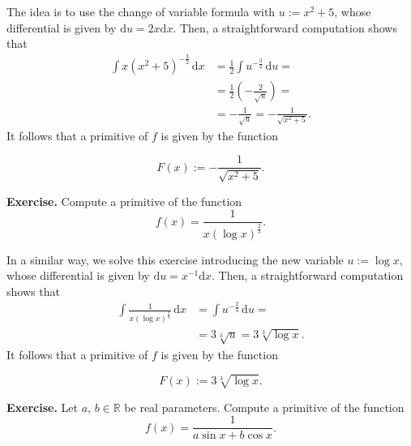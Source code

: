 \documentclass[a4paper,10 pt]{report}
\newcommand{\finalanswer}[1]{%
    \begin{finalAnswer}
    \[
        #1
    \]
    \end{finalAnswer}
}
\theoremstyle{definition}
\newcommand{\R}{\mathbb R}
\begin{document}
\begin{solutionBox} The idea is to use the change of variable formula with $u := x^2 + 5$, whose differential is given by $\mathrm{d}u = 2x \mathrm{d}x$. Then, a straightforward computation shows that
\begin{equation*}\begin{aligned} \int x (x^2 + 5)^{- \frac{3}{2}} \, \mathrm{d}x & = \frac{1}{2} \int u^{- \frac{3}{2}} \, \mathrm{d}u =
\\[1em] & = \frac{1}{2} \left( - \frac{2}{\sqrt{u}} \right) =
\\[1em] & = - \frac{1}{\sqrt{u}} = - \frac{1}{\sqrt{x^2 + 5}}.  \end{aligned} \end{equation*} 
It follows that a primitive of $f$ is given by the function
\finalanswer{
F(x) := - \frac{1}{\sqrt{x^2 + 5}}.
}\end{solutionBox}

\begin{exerciseBox} \textbf{Exercise.}  Compute a primitive of the function
\begin{equation*} f(x) = \frac{1}{x (\log x)^{\frac{2}{3}}}. \end{equation*} \end{exerciseBox}

\begin{solutionBox} In a similar way, we solve this exercise introducing the new variable $u := \log x$, whose differential is given by $\mathrm{d}u = x^{-1} \mathrm{d}x$. Then, a straightforward computation shows that
\begin{equation*}\begin{aligned} \int \frac{1}{x (\log x)^{\frac{2}{3}}} \, \mathrm{d}x & = \int u^{- \frac{2}{3}} \, \mathrm{d}u =
\\[1em] & = 3 \sqrt[3]{u} =3 \sqrt[3]{\log x}. \end{aligned} \end{equation*} 
It follows that a primitive of $f$ is given by the function
\finalanswer{
F(x) := 3 \sqrt[3]{\log x}.
} \end{solutionBox}

\begin{exerciseBox} \textbf{Exercise.}  Let $a, \, b \in \R$ be real parameters. Compute a primitive of the function
\begin{equation*} f(x) = \frac{1}{a \sin x + b \cos x}. \end{equation*} \end{exerciseBox}
\end{document}
